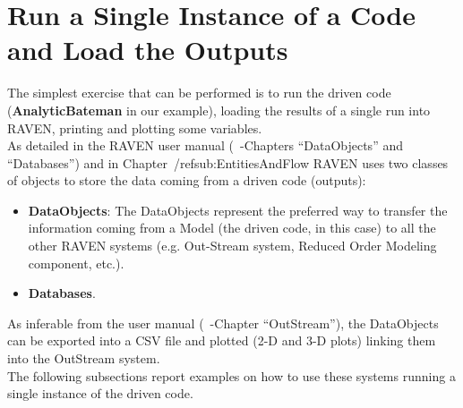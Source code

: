 \section{Run a Single Instance of a Code and Load the Outputs}
The simplest exercise that can be performed is to run the driven code (\textbf{AnalyticBateman}  in our example), loading the results of a single run into RAVEN, printing and plotting some variables.
\\ As detailed in the RAVEN user manual (~\cite{RAVENuserManual}-Chapters ``DataObjects''  and ``Databases'') and in Chapter~/ref{sub:EntitiesAndFlow} RAVEN uses two classes of objects to store the data coming from a driven code (outputs):
\begin{itemize}
  \item \textbf{DataObjects}: The DataObjects represent the preferred way to transfer the information coming from a
   Model (the driven code, in this case) to all the other RAVEN systems (e.g. Out-Stream system, Reduced Order Modeling
   component, etc.).
  \item \textbf{Databases}.
\end{itemize}

As inferable from the user manual (~\cite{RAVENuserManual}-Chapter ``OutStream''), the DataObjects can be exported into a CSV file and plotted (2-D and 3-D plots) linking them into the OutStream system.
\\ The following subsections report examples on how to use these systems running a single instance of the driven code.
